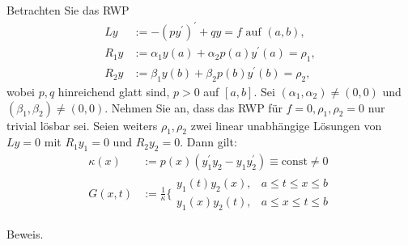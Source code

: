 \begin{exercise}
Betrachten Sie das RWP
\begin{align*}
  Ly &:= -(py^{\prime})^{\prime} + qy = f \text{ auf } (a,b), \\
  R_1y &:= \alpha_1y(a) + \alpha_2p(a)y^{\prime}(a) = \rho_1, \\
  R_2y &:= \beta_1y(b) + \beta_2p(b)y^{\prime}(b) = \rho_2,
\end{align*}
wobei $p,q$ hinreichend glatt sind, $p > 0$ auf $[a,b]$. Sei $(\alpha_1,\alpha_2) \neq (0,0)$
und $(\beta_1,\beta_2) \neq (0,0)$. Nehmen Sie an, dass das RWP für $f = 0, \rho_1,\rho_2 = 0$
nur trivial lösbar sei. Seien weiters $\rho_1,\rho_2$ zwei linear unabhängige Lösungen
von $Ly = 0$ mit $R_1y_1 = 0$ und $R_2y_2 = 0$. Dann gilt:
\begin{align*}
  \kappa(x) &:= p(x)(y_1^{\prime}y_2 - y_1y_2^{\prime}) \equiv \text{const} \neq 0 \\
  G(x,t) &:= \frac{1}{\kappa}\Bigg\{\begin{matrix}
    y_1(t)y_2(x), & a \leq t \leq x \leq b \\
    y_1(x)y_2(t), & a \leq x \leq t \leq b
  \end{matrix}
\end{align*}
\end{exercise}

\begin{solution}
Beweis.
\end{solution}
